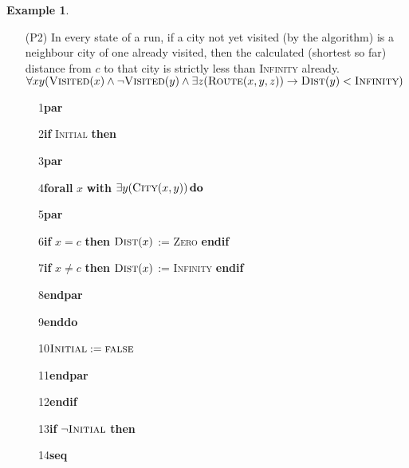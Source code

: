 \documentclass[preprint,11pt]{elsarticle}
\theoremstyle{definition}
\newtheorem{example}{Example}[section]
\theoremstyle{remark}
\begin{document}
\begin{example}
\begin{enumerate}
\item[(P2)] In every state of a run, if a city not yet visited (by the algorithm) is a neighbour city of one already visited, then the calculated (shortest so far) distance from $c$ to that city is strictly less than \textsc{Infinity} already.\\[0.2cm]
$\forall x y (\textsc{Visited}(x) \wedge \neg\textsc{Visited}(y) \wedge \exists z (\textsc{Route}(x,y,z)) \rightarrow \textsc{Dist}(y) < \textsc{Infinity})$

\end{enumerate}
\end{example}


\begin{figure}[!ht]
\small
1\hspace{0.2cm}\textbf{par}

2\hspace{0.7cm}\textbf{if} \textsc{Initial} \textbf{then}

3\hspace{1.2cm}\textbf{par}

4\hspace{1.7cm}\textbf{forall} $x$ \textbf{with} $\exists y ( \textsc{City}(x,y) ) \, \textbf{do}$

5\hspace{2.2cm}\textbf{par}



6\hspace{2.7cm}\textbf{if} $x = c$ \textbf{then} $\textsc{Dist}(x)$ := \textsc{Zero} \textbf{endif}

7\hspace{2.7cm}\textbf{if} $x \neq c$ \textbf{then} $\textsc{Dist}(x)$ := \textsc{Infinity} \textbf{endif}

8\hspace{2.2cm}\textbf{endpar}

9\hspace{1.70cm}\textbf{enddo}

10\hspace{1.55cm}$\textsc{Initial} := \textsc{false}$

11\hspace{1.05cm}\textbf{endpar}

12\hspace{0.55cm}\textbf{endif}

13\hspace{0.55cm}\textbf{if} $\neg \textsc{Initial}$ \textbf{then}

14\hspace{1.05cm}\textbf{seq}


\end{figure}
\end{document}
